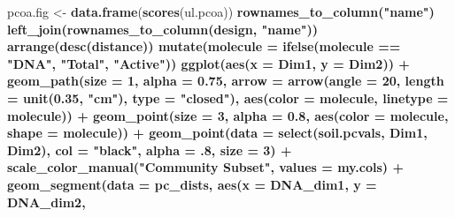 \documentclass[]{article}
\newenvironment{Shaded}{\begin{snugshade}}{\end{snugshade}}
\newcommand{\DataTypeTok}[1]{\textcolor[rgb]{0.13,0.29,0.53}{#1}}
\newcommand{\DecValTok}[1]{\textcolor[rgb]{0.00,0.00,0.81}{#1}}
\newcommand{\FloatTok}[1]{\textcolor[rgb]{0.00,0.00,0.81}{#1}}
\newcommand{\KeywordTok}[1]{\textcolor[rgb]{0.13,0.29,0.53}{\textbf{#1}}}
\newcommand{\NormalTok}[1]{#1}
\newcommand{\OperatorTok}[1]{\textcolor[rgb]{0.81,0.36,0.00}{\textbf{#1}}}
\newcommand{\StringTok}[1]{\textcolor[rgb]{0.31,0.60,0.02}{#1}}
\begin{document}
\begin{Shaded}
\begin{Highlighting}[]
{{{{{{{{\NormalTok{pcoa.fig <-}\StringTok{ }\KeywordTok{data.frame}\NormalTok{(}\KeywordTok{scores}\NormalTok{(ul.pcoa)) }\OperatorTok{%
\StringTok{  }\KeywordTok{rownames_to_column}\NormalTok{(}\StringTok{"name"}\NormalTok{) }\OperatorTok{%
\StringTok{  }\KeywordTok{left_join}\NormalTok{(}\KeywordTok{rownames_to_column}\NormalTok{(design, }\StringTok{"name"}\NormalTok{)) }\OperatorTok{%
\StringTok{  }\KeywordTok{arrange}\NormalTok{(}\KeywordTok{desc}\NormalTok{(distance)) }\OperatorTok{%
\StringTok{  }\KeywordTok{mutate}\NormalTok{(}\DataTypeTok{molecule =} \KeywordTok{ifelse}\NormalTok{(molecule }\OperatorTok{==}\StringTok{ "DNA"}\NormalTok{, }\StringTok{"Total"}\NormalTok{, }\StringTok{"Active"}\NormalTok{)) }\OperatorTok{%
\StringTok{  }\KeywordTok{ggplot}\NormalTok{(}\KeywordTok{aes}\NormalTok{(}\DataTypeTok{x =}\NormalTok{ Dim1, }\DataTypeTok{y =}\NormalTok{ Dim2)) }\OperatorTok{+}
\StringTok{  }\KeywordTok{geom_path}\NormalTok{(}\DataTypeTok{size =} \DecValTok{1}\NormalTok{, }\DataTypeTok{alpha =} \FloatTok{0.75}\NormalTok{, }\DataTypeTok{arrow =} \KeywordTok{arrow}\NormalTok{(}\DataTypeTok{angle =} \DecValTok{20}\NormalTok{,}
                          \DataTypeTok{length =} \KeywordTok{unit}\NormalTok{(}\FloatTok{0.35}\NormalTok{, }\StringTok{"cm"}\NormalTok{),}
                          \DataTypeTok{type =} \StringTok{"closed"}\NormalTok{), }\KeywordTok{aes}\NormalTok{(}\DataTypeTok{color =}\NormalTok{ molecule, }\DataTypeTok{linetype =}\NormalTok{ molecule)) }\OperatorTok{+}
\StringTok{  }\KeywordTok{geom_point}\NormalTok{(}\DataTypeTok{size =} \DecValTok{3}\NormalTok{, }\DataTypeTok{alpha =} \FloatTok{0.8}\NormalTok{, }\KeywordTok{aes}\NormalTok{(}\DataTypeTok{color =}\NormalTok{ molecule, }\DataTypeTok{shape =}\NormalTok{ molecule)) }\OperatorTok{+}\StringTok{ }
\StringTok{  }\KeywordTok{geom_point}\NormalTok{(}\DataTypeTok{data =} \KeywordTok{select}\NormalTok{(soil.pcvals, Dim1, Dim2), }\DataTypeTok{col =} \StringTok{"black"}\NormalTok{, }\DataTypeTok{alpha =} \FloatTok{.8}\NormalTok{, }\DataTypeTok{size =} \DecValTok{3}\NormalTok{) }\OperatorTok{+}
\StringTok{  }\KeywordTok{scale_color_manual}\NormalTok{(}\StringTok{"Community Subset"}\NormalTok{, }\DataTypeTok{values =}\NormalTok{ my.cols) }\OperatorTok{+}
\StringTok{  }\KeywordTok{geom_segment}\NormalTok{(}\DataTypeTok{data =}\NormalTok{ pc_dists,}
               \KeywordTok{aes}\NormalTok{(}\DataTypeTok{x =}\NormalTok{ DNA_dim1, }\DataTypeTok{y =}\NormalTok{ DNA_dim2,}
}}}}}}}}}}}}}
\end{Highlighting}
\end{Shaded}
\end{document}
